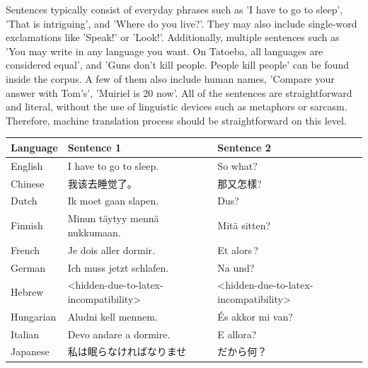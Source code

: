 \documentclass[a4paper]{article}
\begin{document}
Sentences typically consist of everyday phrases such as 'I have to go to sleep', 'That is intriguing', and 'Where do you live?'. They may also include single-word exclamations like 'Speak!' or 'Look!'. Additionally, multiple sentences such as 'You may write in any language you want. On Tatoeba, all languages are considered equal', and 'Guns don't kill people. People kill people' can be found inside the corpus. A few of them also include human names, 'Compare your answer with Tom's', 'Muiriel is 20 now'. All of the sentences are straightforward and literal, without the use of linguistic devices such as metaphors or sarcasm. Therefore, machine translation process should be straightforward on this level.

\begin{CJK}{UTF8}{gbsn}
    \begin{table}[htbp]
        \centering
        \begin{tabular}{|l|l|l|}
            \hline
            \textbf{Language} & \textbf{Sentence 1}                   & \textbf{Sentence 2}                   \\
            \hline
            English           & I have to go to sleep.                & So what?                              \\
            Chinese           & 我该去睡觉了。                               & 那又怎樣?                                 \\
            Dutch             & Ik moet gaan slapen.                  & Dus?                                  \\
            Finnish           & Minun täytyy mennä nukkumaan.         & Mitä sitten?                          \\
            French            & Je dois aller dormir.                 & Et alors ?                            \\
            German            & Ich muss jetzt schlafen.              & Na und?                               \\
            Hebrew            & <hidden-due-to-latex-incompatibility> & <hidden-due-to-latex-incompatibility> \\
            Hungarian         & Aludni kell mennem.                   & És akkor mi van?                      \\
            Italian           & Devo andare a dormire.                & E allora?                             \\
            Japanese          & 私は眠らなければなりませ                          & だから何？                                 \\

\end{tabular}
\end{table}
\end{CJK}
\end{document}
